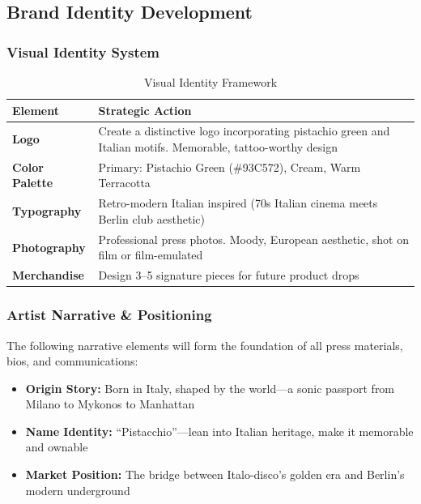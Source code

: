 \documentclass[11pt,a4paper]{article}
\begin{document}
\subsection{Brand Identity Development}

\subsubsection{Visual Identity System}

\begin{table}[h!]
\centering
\renewcommand{\arraystretch}{1.4}
\begin{tabularx}{\textwidth}{>{\bfseries}l X}
\toprule
\rowcolor{amaraprimary}
\textcolor{amaracream}{\textbf{Element}} & \textcolor{amaracream}{\textbf{Strategic Action}} \\
\midrule
Logo & Create a distinctive logo incorporating pistachio green and Italian motifs. Memorable, tattoo-worthy design \\
Color Palette & Primary: Pistachio Green (\#93C572), Cream, Warm Terracotta \\
Typography & Retro-modern Italian inspired (70s Italian cinema meets Berlin club aesthetic) \\
Photography & Professional press photos. Moody, European aesthetic, shot on film or film-emulated \\
Merchandise & Design 3--5 signature pieces for future product drops \\
\bottomrule
\end{tabularx}
\caption{Visual Identity Framework}
\end{table}

\subsubsection{Artist Narrative \& Positioning}

The following narrative elements will form the foundation of all press materials, bios, and communications:

\begin{itemize}[leftmargin=*]
    \item \textbf{Origin Story:} Born in Italy, shaped by the world---a sonic passport from Milano to Mykonos to Manhattan
    \item \textbf{Name Identity:} ``Pistacchio''---lean into Italian heritage, make it memorable and ownable
    \item \textbf{Market Position:} The bridge between Italo-disco's golden era and Berlin's modern underground
\end{itemize}
\end{document}
